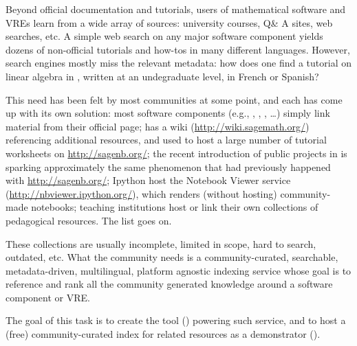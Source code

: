 \begin{workpackage}
\begin{tasklist}
\begin{task}[title=Demonstrator: Interactive books,
id=ibook,lead=US,PM=30]
\end{task}

\begin{task}[title=Demonstrator: Computational mathematics resources indexing service,
id=index-librorum-salvificorum] Beyond official documentation and
  tutorials, users of mathematical software and VREs learn from a wide
  array of sources: university courses, Q\& A sites, web searches,
  etc.  A simple web search on any major software component yields
  dozens of non-official tutorials and how-tos in many different
  languages. However, search engines mostly miss the relevant
  metadata: how does one find a tutorial on linear algebra in \PariGP,
  written at an undegraduate level, in French or Spanish?

This need has been felt by most communities at some point, and each
has come up with its own solution: most software components (e.g.,
\GAP, \PariGP, \Sage, \dots) simply link material from their official
page; \Sage has a wiki (\url{http://wiki.sagemath.org/}) referencing
additional resources, and used to host a large number of tutorial
worksheets on \url{http://sagenb.org/}; the recent introduction of
public projects in \SMC is sparking approximately the same phenomenon
that had previously happened with \url{http://sagenb.org/}; Ipython
host the Notebook Viewer service (\url{http://nbviewer.ipython.org/}),
which renders (without hosting) community-made notebooks; teaching
institutions host or link their own collections of pedagogical
resources. The list goes on.

These collections are usually incomplete, limited in scope, hard to
search, outdated, etc.  What the community needs is a
community-curated, searchable, metadata-driven, multilingual, platform
agnostic indexing service whose goal is to reference and rank all the
community generated knowledge around a software component or VRE.

The goal of this task is to create the tool
() powering such service, and to host a
(free) community-curated index for \TheProject related resources as a
demonstrator ().

\end{task}
\end{tasklist}




\end{workpackage}

